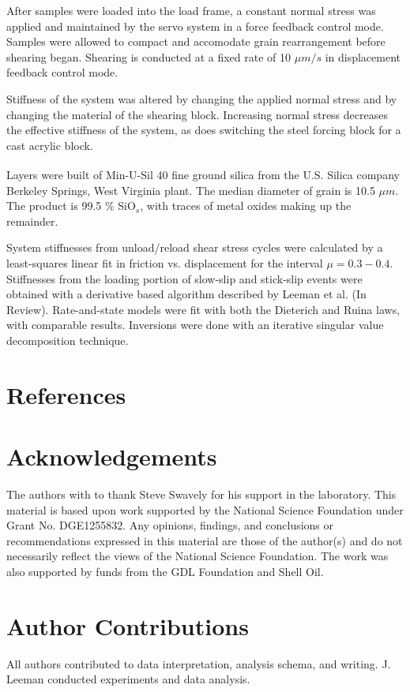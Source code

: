 \documentclass[11pt]{article}
\begin{document}
After samples were loaded into the load frame, a constant normal stress was
applied and maintained by the servo system in a force feedback control mode.
Samples were allowed to compact and accomodate grain rearrangement before
shearing began. Shearing is conducted at a fixed rate of 10 $\mu m/s$ in
displacement feedback control mode.

Stiffness of the system was altered by changing the applied normal stress and by
changing the material of the shearing block. Increasing normal stress decreases
the effective stiffness of the system, as does switching the steel forcing block
for a cast acrylic block.

Layers were built of Min-U-Sil\textsuperscript{\textregistered} 40 fine ground silica from the U.S. Silica\textsuperscript{\textregistered}
company Berkeley Springs, West Virginia plant. The median diameter of grain is
10.5 $\mu m$. The product is 99.5 \% SiO$_s$, with traces of metal oxides making
up the remainder.

System stiffnesses from unload/reload shear stress cycles were calculated by a
least-squares linear fit in friction vs. displacement for the interval $\mu =
0.3-0.4$. Stiffnesses from the loading portion of slow-slip and stick-slip
events were obtained with a derivative based algorithm described by Leeman et
al. (In Review). Rate-and-state models were fit with both the Dieterich and
Ruina laws, with comparable results. Inversions were done with an iterative
singular value decomposition technique.  

\section{References}


\section{Acknowledgements}
The authors with to thank Steve Swavely for his support in the laboratory. This
material is based upon work supported by the National Science Foundation under
Grant No. DGE1255832.  Any opinions, findings, and conclusions or
recommendations expressed in this material are those of the author(s) and do not
necessarily reflect the views of the National Science Foundation. The work was
also supported by funds from the GDL Foundation and Shell Oil.

\section{Author Contributions}
All authors contributed to data interpretation, analysis schema, and writing.
J. Leeman conducted experiments and data analysis.
\end{document}
